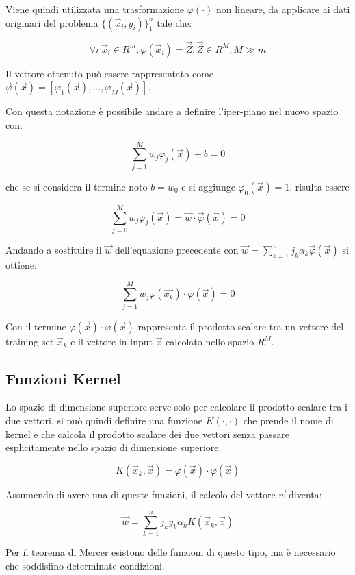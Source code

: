 Viene quindi utilizzata una trasformazione $\varphi(\cdot)$ non lineare, da applicare ai dati originari del problema $\{(\vec{x}_i, y_i)\}_1^n$ tale che:

$$ \forall i \: \vec{x}_i \in R^m, \varphi(\vec{x}_i) = \vec{Z}, \vec{Z} \in R^M, M \gg m $$

Il vettore ottenuto può essere rappresentato come $\vec{\varphi}(\vec{x}) = [ \varphi_1(\vec{x}), \ldots , \varphi_M(\vec{x}) ] $.

Con questa notazione è possibile andare a definire l'iper-piano nel nuovo spazio con:

$$ \sum\limits_{j=1}^M w_j \varphi_j(\vec{x}) + b = 0$$

che se si considera il termine noto $b = w_0$ e si aggiunge $\varphi_0(\vec{x}) = 1$, risulta essere

$$ \sum\limits_{j=0}^M w_j \varphi_j(\vec{x}) = \vec{w} \cdot \vec{\varphi}(\vec{x}) = 0$$

Andando a sostituire il $\vec{w}$ dell'equazione precedente con $ \vec{w} = \sum\limits_{k=1}^n j_k \alpha_k \vec{\varphi}(\vec{x})$ si ottiene:

$$ \sum\limits_{j=1}^M w_j \varphi(\vec{x_k}) \cdot \varphi(\vec{x}) = 0 $$

Con il termine $\varphi(\vec{x}) \cdot \varphi(\vec{x})$ rappresenta il prodotto scalare tra un vettore del training set $\vec{x}_k$ e il vettore in input $\vec{x}$ calcolato nello spazio $R^M$.

\subsection{Funzioni Kernel}\label{funzioni-kernel}

Lo spazio di dimensione superiore serve solo per calcolare il prodotto scalare tra i due vettori, si può quindi definire una funzione $K(\cdot, \cdot)$ che prende il nome di kernel e che calcola il prodotto scalare dei due vettori senza passare esplicitamente nello spazio di dimensione superiore.

$$ K(\vec{x}_k, \vec{x}) = \varphi(\vec{x}) \cdot \varphi(\vec{x})$$

Assumendo di avere una di queste funzioni, il calcolo del vettore $\vec{w}$ diventa:

$$ \vec{w} = \sum\limits_{k=1}^n j_k y_k \alpha_k K(\vec{x}_k, \vec{x}) $$

Per il teorema di Mercer esistono delle funzioni di questo tipo, ma è necessario che soddisfino determinate condizioni.

